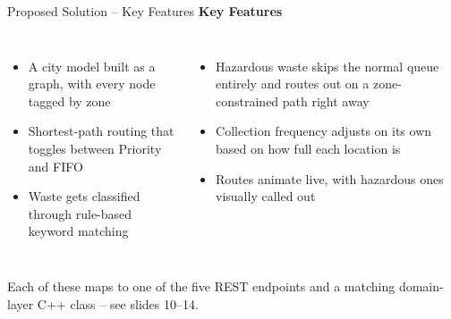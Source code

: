 \documentclass[aspectratio=169,11pt]{beamer}
\begin{document}
\begin{frame}{Proposed Solution -- Key Features}
\textbf{\color{GEUBlue}Key Features}
\vspace{1mm}
\begin{columns}[T,totalwidth=\textwidth]
\begin{itemize}\itemsep3pt
\item A city model built as a graph, with every node tagged by zone
\item Shortest-path routing that toggles between Priority and FIFO
\item Waste gets classified through rule-based keyword matching
\end{itemize}
\begin{itemize}\itemsep3pt
\item Hazardous waste skips the normal queue entirely and routes out on a zone-constrained path right away
\item Collection frequency adjusts on its own based on how full each location is
\item Routes animate live, with hazardous ones visually called out
\end{itemize}
\end{columns}
\vfill
\begin{center}
\colorbox{GEULightBlue}{\parbox{.85\textwidth}{\centering
Each of these maps to one of the five REST endpoints and a matching domain-layer C++ class -- see slides 10--14.}}
\end{center}
\end{frame}
\end{document}

